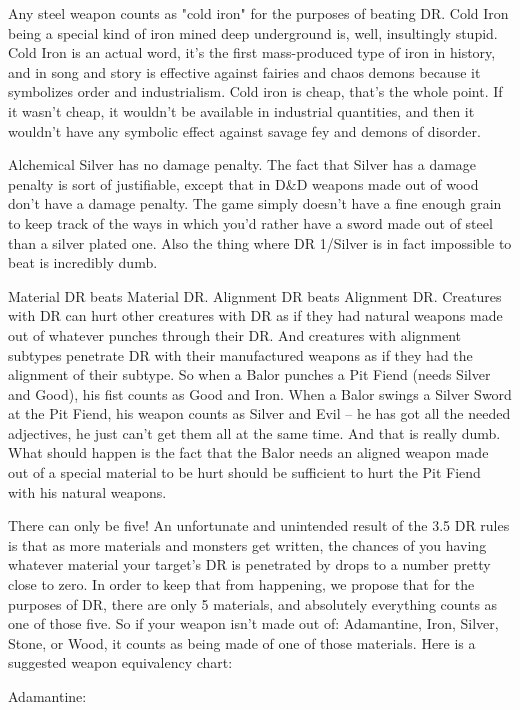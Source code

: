 \listone
\item Any steel weapon counts as "cold iron" for the purposes of beating DR. Cold Iron being a special kind of iron mined deep underground is, well, insultingly stupid. Cold Iron is an actual word, it's the first mass-produced type of iron in history, and in song and story is effective against fairies and chaos demons because it symbolizes order and industrialism. Cold iron is cheap, that's the whole point. If it wasn't cheap, it wouldn't be available in industrial quantities, and then it wouldn't have any symbolic effect against savage fey and demons of disorder.
\item Alchemical Silver has no damage penalty. The fact that Silver has a damage penalty is sort of justifiable, except that in D\&D weapons made out of wood don't have a damage penalty. The game simply doesn't have a fine enough grain to keep track of the ways in which you'd rather have a sword made out of steel than a silver plated one. Also the thing where DR 1/Silver is in fact impossible to beat is incredibly dumb.
\item Material DR beats Material DR. Alignment DR beats Alignment DR. Creatures with DR can hurt other creatures with DR as if they had natural weapons made out of whatever punches through their DR. And creatures with alignment subtypes penetrate DR with their manufactured weapons as if they had the alignment of their subtype. So when a Balor punches a Pit Fiend (needs Silver and Good), his fist counts as Good and Iron. When a Balor swings a Silver Sword at the Pit Fiend, his weapon counts as Silver and Evil -- he has got all the needed adjectives, he just can't get them all at the same time. And that is really dumb. What should happen is the fact that the Balor needs an aligned weapon made out of a special material to be hurt should be sufficient to hurt the Pit Fiend with his natural weapons.
\item There can only be five! An unfortunate and unintended result of the 3.5 DR rules is that as more materials and monsters get written, the chances of you having whatever material your target's DR is penetrated by drops to a number pretty close to zero. In order to keep that from happening, we propose that for the purposes of DR, there are only 5 materials, and absolutely everything counts as one of those five. So if your weapon isn't made out of: Adamantine, Iron, Silver, Stone, or Wood, it counts as being made of one of those materials. Here is a suggested weapon equivalency chart:
\listtwo
    \item Adamantine: \listthree\small

